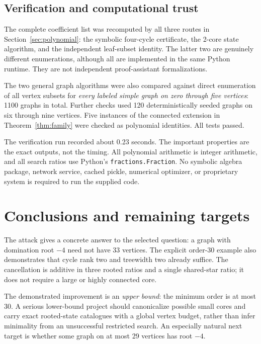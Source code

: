 \documentclass[11pt]{article}
\numberwithin{equation}{section}
\theoremstyle{definition}
\begin{document}
\subsection{Verification and computational trust}

The complete coefficient list was recomputed by all three routes in
Section~\ref{sec:polynomial}: the symbolic four-cycle certificate,
the 2-core state algorithm, and the independent leaf-subset identity.
The latter two are genuinely different enumerations, although all are
implemented in the same Python runtime. They are not independent
proof-assistant formalizations.

The two general graph algorithms were also compared against direct
enumeration of all vertex subsets for \emph{every labeled simple graph
on zero through five vertices}: 1100 graphs in total. Further checks
used 120 deterministically seeded graphs on six through nine vertices.
Five instances of the connected extension in Theorem~\ref{thm:family}
were checked as polynomial identities. All tests passed.

The verification run recorded about 0.23 seconds. The important
properties are the exact outputs, not the timing. All polynomial
arithmetic is integer arithmetic, and all search ratios use Python's
\texttt{fractions.Fraction}. No symbolic algebra package, network
service, cached pickle, numerical optimizer, or proprietary system is
required to run the supplied code.

\section{Conclusions and remaining targets}\label{sec:conclusion}

The attack gives a concrete answer to the selected question: a graph
with domination root \(-4\) need not have 33 vertices. The explicit
order-30 example also demonstrates that cycle rank two and treewidth
two already suffice. The cancellation is additive in three rooted
ratios and a single shared-star ratio; it does not require a large
or highly connected core.

The demonstrated improvement is an \emph{upper bound}: the minimum
order is at most 30. A serious lower-bound project should canonicalize
possible small cores and carry exact rooted-state catalogues with a
global vertex budget, rather than infer minimality from an unsuccessful
restricted search. An especially natural next target is whether some
graph on at most 29 vertices has root \(-4\).
\end{document}
